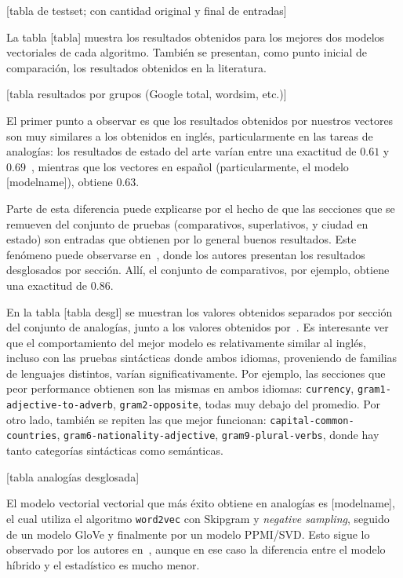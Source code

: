 [tabla de testset; con cantidad original y final de entradas]

\quad

La tabla [tabla] muestra los resultados obtenidos para los mejores dos modelos vectoriales de cada
algoritmo. También se presentan, como punto inicial de comparación, los resultados obtenidos en la
literatura.

[tabla resultados por grupos (Google total, wordsim, etc.)]

El primer punto a observar es que los resultados obtenidos por nuestros vectores son muy similares a
los obtenidos en inglés, particularmente en las tareas de analogías: los resultados de estado del
arte varían entre una exactitud de $0.61$ y $0.69$~\cite{Levy2015, Baroni2014, Pennington2014,
Mikolov2013c}, mientras que los vectores en español (particularmente, el modelo [modelname]),
obtiene $0.63$.

Parte de esta diferencia puede explicarse por el hecho de que las secciones que se remueven del
conjunto de pruebas (comparativos, superlativos, y ciudad en estado) son entradas que obtienen por
lo general buenos resultados. Este fenómeno puede observarse en~\cite{Levy2014b}, donde los autores
presentan los resultados desglosados por sección. Allí, el conjunto de comparativos, por ejemplo,
obtiene una exactitud de $0.86$.

En la tabla [tabla desgl] se muestran los valores obtenidos separados por sección del conjunto de
analogías, junto a los valores obtenidos por~\cite{Levy2014b}. Es interesante ver que el
comportamiento del mejor modelo es relativamente similar al inglés, incluso con las pruebas
sintácticas donde ambos idiomas, proveniendo de familias de lenguajes distintos, varían
significativamente. Por ejemplo, las secciones que peor performance obtienen son las mismas en ambos
idiomas: \texttt{currency}, \texttt{gram1-adjective-to-adverb}, \texttt{gram2-opposite}, todas muy
debajo del promedio. Por otro lado, también se repiten las que mejor funcionan:
\texttt{capital-common-countries}, \texttt{gram6-nationality-adjective},
\texttt{gram9-plural-verbs}, donde hay tanto categorías sintácticas como semánticas.

[tabla analogías desglosada]

El modelo vectorial vectorial que más éxito obtiene en analogías es [modelname], el cual utiliza el
algoritmo \texttt{word2vec} con Skipgram y \textit{negative sampling}, seguido de un modelo GloVe y
finalmente por un modelo PPMI/SVD\@. Esto sigue lo observado por los autores en~\cite{Levy2015},
aunque en ese caso la diferencia entre el modelo híbrido y el estadístico es mucho menor.

